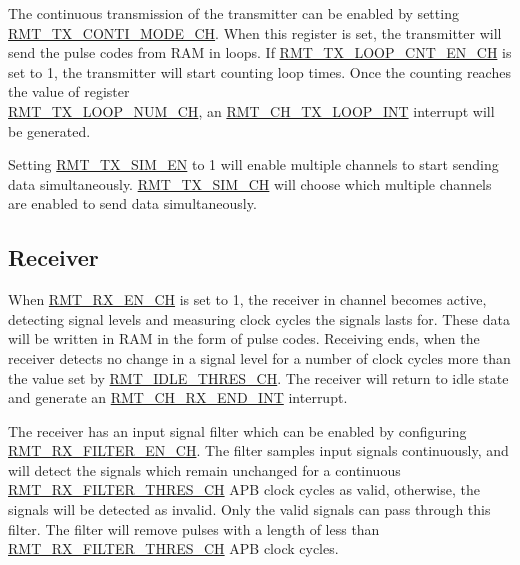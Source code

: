 \documentclass[main\_\_EN.tex]{subfiles}
\begin{document}
The continuous transmission of the transmitter can be enabled by setting \hyperref[fielddesc:RMTREGTXCONTIMODECHN]{RMT\_TX\_CONTI\_MODE\_CH}. When this register is set, the transmitter will send the pulse codes from RAM in loops. If \hyperref[fielddesc:RMTREGTXLOOPCNTENCHN]{RMT\_TX\_LOOP\_CNT\_EN\_CH} is set to 1, the transmitter will start counting loop times. Once the counting reaches the value of register \\
\hyperref[fielddesc:RMTREGTXLOOPNUMCHN]{RMT\_TX\_LOOP\_NUM\_CH}, an \hyperref[int:RMTCHnTXLOOPINT]{RMT\_CH\_TX\_LOOP\_INT} interrupt will be generated.

Setting \hyperref[fielddesc:RMTREGTXSIMEN]{RMT\_TX\_SIM\_EN} to 1 will enable multiple channels to start sending data simultaneously. \hyperref[fielddesc:RMTREGTXSIMCHN]{RMT\_TX\_SIM\_CH} will choose which multiple channels are enabled to send data simultaneously.

\subsection{Receiver}
When \hyperref[fielddesc:RMTREGRXENCHN]{RMT\_RX\_EN\_CH} is set to 1, the receiver in channel  becomes active, detecting signal levels and measuring clock cycles the signals lasts for. These data will be written in RAM in the form of pulse codes. Receiving ends, when the receiver detects no change in a signal level for a number of clock cycles more than the value set by \hyperref[fielddesc:RMTREGIDLETHRESCHN]{RMT\_IDLE\_THRES\_CH}. The receiver will return to idle state and generate an \hyperref[int:RMTCHnRXENDINT]{RMT\_CH\_RX\_END\_INT} interrupt.

The receiver has an input signal filter which can be enabled by configuring \hyperref[fielddesc:RMTREGRXFILTERENCHN]{RMT\_RX\_FILTER\_EN\_CH}. The filter samples input signals continuously, and will detect the signals which remain unchanged for a continuous \hyperref[fielddesc:RMTREGRXFILTERTHRESCHN]{RMT\_RX\_FILTER\_THRES\_CH} APB clock cycles as valid, otherwise, the signals will be detected as invalid. Only the valid signals can pass through this filter. The filter will remove pulses with a length of less than \hyperref[fielddesc:RMTREGRXFILTERTHRESCHN]{RMT\_RX\_FILTER\_THRES\_CH} APB clock cycles.
\end{document}
